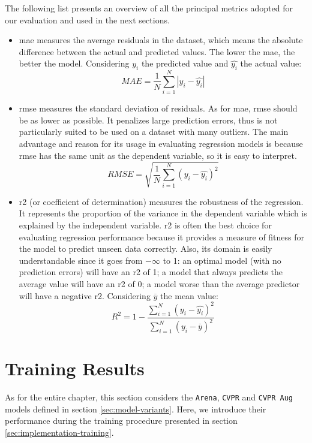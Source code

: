 The following list presents an overview of all the principal metrics adopted for our evaluation and used in the next sections.

\begin{itemize}
	\item \gls{mae} measures the average residuals in the dataset, which means the absolute difference between the actual and predicted values. The lower the \gls{mae}, the better the model. Considering $y_i$ the predicted value and $\hat{y_i}$ the actual value:
	$$ MAE = \frac{1}{N} \sum_{i=1}^N |y_i - \hat{y_i}| $$
	
	\item \gls{rmse} measures the standard deviation of residuals. As for \gls{mae}, \gls{rmse} should be as lower as possible. It penalizes large prediction errors, thus is not particularly suited to be used on a dataset with many outliers. The main advantage and reason for its usage in evaluating regression models is because \gls{rmse} has the same unit as the dependent variable, so it is easy to interpret.
	$$ RMSE = \sqrt{\frac{1}{N} \sum_{i=1}^N (y_i - \hat{y_i})^2} $$
	
	\item \gls{r2} (or coefficient of determination) measures the robustness of the regression. It represents the proportion of the variance in the dependent variable which is explained by the independent variable. \gls{r2} is often the best choice for evaluating regression performance because it provides a measure of fitness for the model to predict unseen data correctly. Also, its domain is easily understandable since it goes from $-\infty$ to 1: an optimal model (with no prediction errors) will have an \gls{r2} of 1; a model that always predicts the average value will have an \gls{r2} of 0; a model worse than the average predictor will have a negative \gls{r2}. Considering $\overline{y}$ the mean value:
	$$ R^2 = 1 - \frac{\sum_{i=1}^N (y_i - \hat{y_i})^2}{\sum_{i=1}^N (y_i - \overline{y})^2} $$
\end{itemize}




\section{Training Results}
\label{sec:evaluation-training}

As for the entire chapter, this section considers the \texttt{Arena}, \texttt{CVPR} and \texttt{CVPR Aug} models defined in section \ref{sec:model-variants}. Here, we introduce their performance during the training procedure presented in section \ref{sec:implementation-training}.

